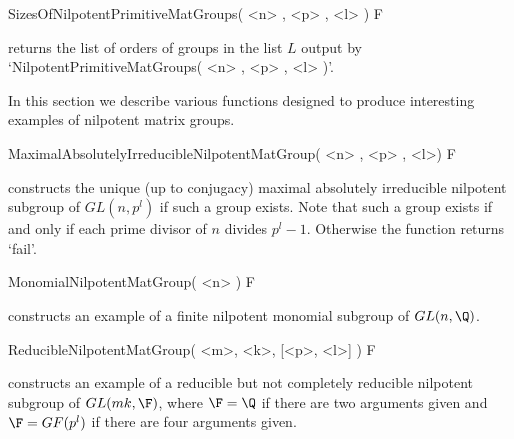 \> SizesOfNilpotentPrimitiveMatGroups( <n> , <p> , <l> ) F

returns the list of orders of groups in the list $L$ output by
`NilpotentPrimitiveMatGroups( <n> , <p> , <l> )'.


In this section we describe various functions designed to produce
interesting examples of nilpotent matrix groups.

\>  MaximalAbsolutelyIrreducibleNilpotentMatGroup( <n> , <p> , <l>) F

constructs the unique (up to conjugacy) maximal absolutely
irreducible nilpotent subgroup of $GL(n,p^l)$ if such a group
exists. Note that such a group exists if and only if each prime
divisor of $n$ divides $p^l-1$. Otherwise the function returns
`fail'.

\> MonomialNilpotentMatGroup( <n> ) F

constructs an example of a finite nilpotent monomial subgroup of $GL(n,\Q)$.

\> ReducibleNilpotentMatGroup( <m>, <k>, [<p>, <l>] ) F

constructs an example of a reducible but not completely reducible
nilpotent subgroup of $GL(mk, \F)$, where $\F = \Q$ if there are
two arguments given and $\F = GF(p^l)$ if there are four arguments
given.
